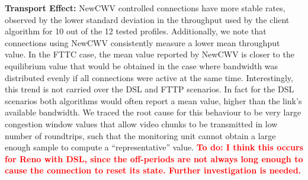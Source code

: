 \documentclass[10pt,sigconf]{acmart}
\newcommand{\todo}[1]{\textbf{\textcolor{red}{To do: #1}}}
\begin{document}




\textbf{Transport Effect:} NewCWV controlled connections have more stable rates, observed by the lower standard deviation in the throughput used by the client algorithm for 10 out of the 12 tested profiles. Additionally, we note that connections using NewCWV consistently measure a lower mean throughput value. In the FTTC case, the mean value reported by NewCWV is closer to the equilibrium value that would be obtained in the case where bandwidth was distributed evenly if all connections were active at the same time. Interestingly, this trend is not carried over the DSL and FTTP scenarios. In fact for the DSL scenarios both algorithms would often report a mean value, higher than the link's available bandwidth. We traced the root cause for this behaviour to be very large congestion window values that allow video chunks to be transmitted in low number of roundtrips, such that the monitoring unit cannot obtain a large enough sample to compute a ``representative'' value.
\todo{I think this occurs for Reno with DSL, since the off-periods are not always long enough to cause the connection to reset its state. Further investigation is needed.}
\end{document}
